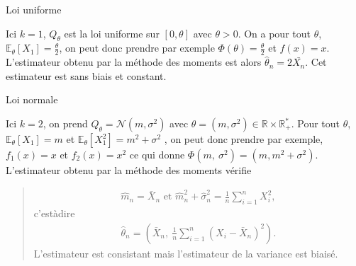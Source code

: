 \documentclass[letterpaper,11pt,english]{sphinxmanual}
\begin{document}
\begin{DUlineblock}{0em}
\item[]  Loi uniforme
\item[] Ici \(k=1\), \(Q_{\theta}\) est la loi uniforme sur
\([0,\theta]\) avec \(\theta > 0\). On a pour tout
\(\theta\),
\(\displaystyle \mathbb{E}_{\theta}[X_1] = \frac{\theta}{2}\), on
peut donc prendre par exemple
\(\displaystyle \Phi(\theta) = \frac{\theta}{2}\) et
\(f(x) = x\). L’estimateur obtenu par la méthode des moments est
alors \(\hat{\theta}_n =2\bar{X_n}\). Cet estimateur est sans
biais et constant.
\item[]  Loi normale
\item[] Ici \(k=2\), on prend \(Q_{\theta} = \mathcal{N}(m,\sigma^2)\)
avec
\(\theta = (m,\sigma^2)\in\mathbb{R}\times\mathbb{R}_{+}^{*}\).
Pour tout \(\theta\), \(\mathbb{E}_{\theta}[X_1] = m\) et
\(\mathbb{E}_{\theta}[X_1^2] = m^2 + \sigma^2\) , on peut donc
prendre par exemple, \(f_1(x) = x\) et \(f_2(x) = x^2\) ce qui
donne \(\Phi(m,\ \sigma^2) = (m,m^2+\sigma^2)\). L’estimateur
obtenu par la méthode des moments vérifie
\end{DUlineblock}
\begin{quote}
\begin{equation}\label{equation:chapter2:chapter2:66}
\begin{split}\hat{m}_{n}=\bar{X}_{n} \text { et } \hat{m}_{n}^{2}+\hat{\sigma}_{n}^2=\frac{1}{n} \sum_{i=1}^{n} X_{i}^{2},\end{split}
\end{equation}
\sphinxAtStartPar
c’est\sphinxhyphen{}à\sphinxhyphen{}dire
\begin{equation}\label{equation:chapter2:chapter2:67}
\begin{split}\hat{\theta}_{n}=\left(\bar{X}_{n},\ \frac{1}{n} \sum_{i=1}^{n}\left(X_{i}-\bar{X}_{n}\right)^{2}\right).\end{split}
\end{equation}
\sphinxAtStartPar
L’estimateur est consistant mais l’estimateur de la variance est
biaisé.
\end{quote}
\end{document}
